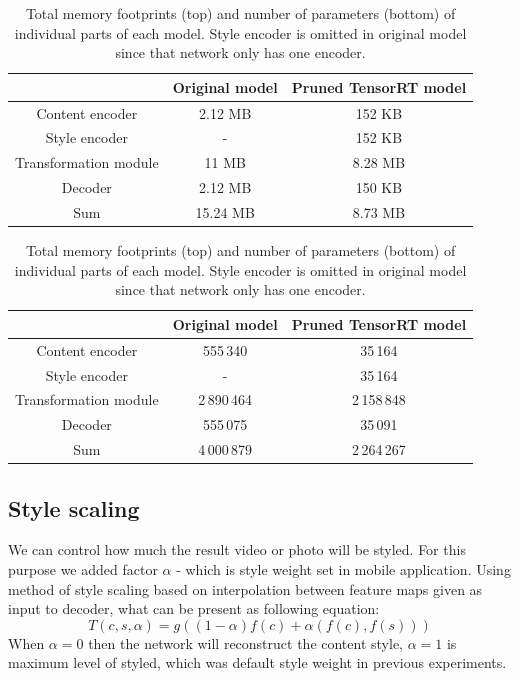 \documentclass[../Main.tex]{subfiles}
\begin{document}
\begin{table}
\begin{center}

\begin{tabular}{|c|c|c|}
\hline
                      &  Original model & Pruned TensorRT model \\
\hline
Content encoder       &  2.12 MB        & 152 KB   \\
\hline
Style encoder         &  -              & 152 KB   \\
\hline
Transformation module &  11 MB          & 8.28 MB  \\
\hline
Decoder               &  2.12 MB        & 150 KB   \\
\hline
Sum                   &  15.24 MB       & 8.73 MB  \\
\hline
\end{tabular}
\vspace{1em}

\begin{tabular}{|c|c|c|}
\hline
                      &  Original model & Pruned TensorRT model \\
\hline
Content encoder       &   555\,340        &  35\,164       \\
\hline
Style encoder         &  -              &  35\,164       \\
\hline
Transformation module &   2\,890\,464     &   2\,158\,848  \\
\hline
Decoder               &   555\,075       &   35\,091      \\
\hline
Sum                   &   4\,000\,879       &    2\,264\,267   \\
\hline
\end{tabular}

\end{center}
\caption{\label{table:memory} Total memory footprints (top) and number of parameters (bottom)
    of individual parts of each model. Style encoder
    is omitted in original model since that network only has one encoder.
    }
\end{table}

\subsection{Style scaling}
We can control how much the result video or photo will be styled. For this purpose we added factor $\alpha$ -  which is style weight set in mobile application. Using method of style scaling based on interpolation between feature maps given as input to decoder, what can be present as following equation: $$T(c,s,\alpha) = g((1-\alpha)f(c)+\alpha (f(c),f(s)))$$ When $\alpha= 0$  then the network will reconstruct the content style, $\alpha = 1$ is maximum level of styled, which was default style weight in previous experiments. 
\end{document}
